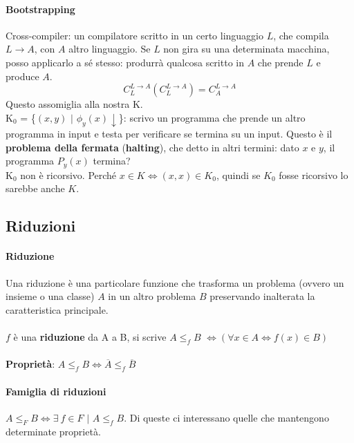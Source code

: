 \documentclass[10pt]{book}
\begin{document}
\paragraph{Bootstrapping} Cross-compiler: un compilatore scritto in un certo linguaggio $L$, che compila $L \rightarrow A$, con $A$ altro linguaggio. Se $L$ non gira su una determinata macchina, posso applicarlo a sé stesso: produrrà qualcosa scritto in $A$ che prende $L$ e produce $A$.\\
$$C_L^{L\rightarrow A} (C_L^{L\rightarrow A})= C_A^{L\rightarrow A}$$
Questo assomiglia alla nostra K.\\
K$_0$ = \{$(x, y)$ $|$ $\phi_y(x)\downarrow$\}: scrivo un programma che prende un altro programma in input e testa per verificare se termina su un input. Questo è il \textbf{problema della fermata} (\textbf{halting}), che detto in altri termini: dato $x$ e $y$, il programma $P_y(x)$ termina?\\
K$_0$ non è ricorsivo. Perché $x \in K \Leftrightarrow (x, x) \in K_0$, quindi se $K_0$ fosse ricorsivo lo sarebbe anche $K$.
\pagebreak
\subsection{Riduzioni}
\paragraph{Riduzione} Una riduzione è una particolare funzione che trasforma un problema (ovvero un insieme o una classe) $A$ in un altro problema $B$ preservando inalterata la caratteristica principale.\\\\
$f$ è una \textbf{riduzione} da A a B, si scrive $A \leq_f B$ $\Leftrightarrow (\forall x \in A \Leftrightarrow f(x) \in B)$\\\\
\textbf{Proprietà}: $A \leq_f B \Leftrightarrow \overline{A} \leq_f \overline{B}$
\paragraph{Famiglia di riduzioni} $A \leq_F B \Leftrightarrow \exists\:f \in F$ $|$ $A \leq_f B$. Di queste ci interessano quelle che mantengono determinate proprietà.
\end{document}
